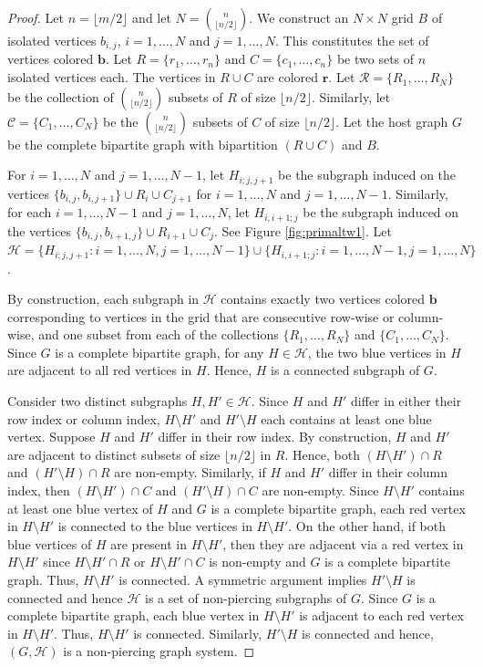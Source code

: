 \documentclass[12pt]{article}
\newcommand{\R}{\mathbf{r}}
\newcommand{\B}{\mathbf{b}}
\newcommand{\HH}{\mathcal{H}}
\theoremstyle{case}
\begin{document}
\primallb*
\begin{proof}
Let $n = \lfloor m/2\rfloor$ and let $N = \binom{n}{\lfloor n/2 \rfloor}$.
We construct an $N\times N$ grid $B$ of isolated vertices $b_{i,j}$, $i=1,\ldots, N$ and $j=1,\ldots, N$.
This constitutes the set of vertices colored $\B$.
Let $R=\{r_1,\ldots, r_n\}$ and $C=\{c_1,\ldots, c_n\}$ be two sets of $n$ isolated vertices each.
The vertices in $R\cup C$ are colored $\R$.
Let $\mathcal{R}=\{R_1,\ldots, R_{N}\}$ be the collection of $\binom{n}{\lfloor n/2 \rfloor}$ subsets of $R$ of size $\lfloor n/2 \rfloor$.
Similarly, let $\mathcal{C}=\{C_1,\ldots, C_{N}\}$ be the $\binom{n}{\lfloor n/2 \rfloor}$ subsets of $C$ of size $\lfloor n/2 \rfloor$.
Let the host graph $G$ be the complete bipartite graph with bipartition $(R\cup C)$ and $B$.

For $i=1,\ldots, N$ and $j=1,\ldots, N-1$, let $H_{i;j,j+1}$ be the subgraph induced on the vertices $\{b_{i,j}, b_{i,j+1}\}\cup R_i\cup C_{j+1}$ for $i=1,\ldots, N$ and $j=1,\ldots, N-1$.
Similarly, for each $i=1,\ldots, N-1$ and $j=1,\ldots, N$, let $H_{i,i+1;j}$ be the subgraph induced on the vertices $\{b_{i,j}, b_{i+1,j}\}\cup R_{i+1}\cup C_j$.
See Figure \ref{fig:primaltw1}.
Let $\mathcal{H}=\{H_{i;j,j+1}:i=1,\ldots, N, j=1,\ldots, N-1\}\cup\{H_{i,i+1;j}:i=1,\ldots, N-1, j=1,\ldots, N\}$.

By construction, each subgraph in $\mathcal{H}$ contains exactly two vertices colored $\B$ corresponding to vertices in the grid that are
consecutive row-wise or column-wise, and one subset from each of the collections $\{R_1,\ldots, R_N\}$ and $\{C_1,\ldots, C_N\}$.
Since $G$ is a complete bipartite graph, for any $H\in\mathcal{H}$, 
the two blue vertices in $H$ are adjacent to all red vertices in $H$. Hence, $H$ is a connected subgraph of $G$.

Consider two distinct subgraphs $H,H'\in\mathcal{H}$. Since $H$ and $H'$ differ in either their row index or column index, 
$H\setminus H'$ and $H'\setminus H$ each contains at least one blue vertex.
Suppose $H$ and $H'$ differ in their row index.
By construction, $H$ and $H'$ are adjacent to distinct subsets of size $\lfloor n/2\rfloor$ in $R$. Hence, 
both $(H\setminus H')\cap R$ and $(H'\setminus H)\cap R$ are non-empty. 
Similarly, if $H$ and $H'$ differ in their column index, then $(H\setminus H')\cap C$ and $(H'\setminus H)\cap C$
are non-empty. Since $H\setminus H'$ contains at least one blue vertex of $H$ and 
$G$ is a complete bipartite graph,
each red vertex in $H\setminus H'$ is connected to the blue vertices in $H\setminus H'$. On the other hand, if both
blue vertices of $H$ are present in $H\setminus H'$, then they are adjacent via a red vertex in $H\setminus H'$ 
since $H\setminus H'\cap R$ or $H\setminus H'\cap C$ is non-empty and $G$ is a complete bipartite graph. 
Thus, $H\setminus H'$ is connected. A symmetric argument implies $H'\setminus H$ is
connected and hence $\mathcal{H}$ is a set of non-piercing subgraphs of $G$.
Since $G$ is a complete bipartite graph, each blue vertex in $H\setminus H'$ is adjacent to each red vertex in $H\setminus H'$.
Thus, $H\setminus H'$ is connected.
Similarly, $H'\setminus H$ is connected and hence, $(G,\HH)$ is a non-piercing graph system.


\end{proof}
\end{document}
